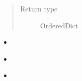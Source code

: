 \documentclass[letterpaper,10pt,english]{sphinxmanual}
\begin{document}
\begin{fulllineitems}
\begin{quote}
\begin{description}
\item[{Return type}] \leavevmode
OrderedDict

\end{description}\end{quote}



\begin{itemize}
\item {} 
{\hyperref[\detokenize{functions:pyresid.request_fulltextXML}]{}}

\item {} 
{\hyperref[\detokenize{functions:pyresid.parse_request}]{}}

\item {} 
{\hyperref[\detokenize{functions:pyresid.reconstruct_fulltext}]{}}

\end{itemize}



\end{fulllineitems}

\end{document}
